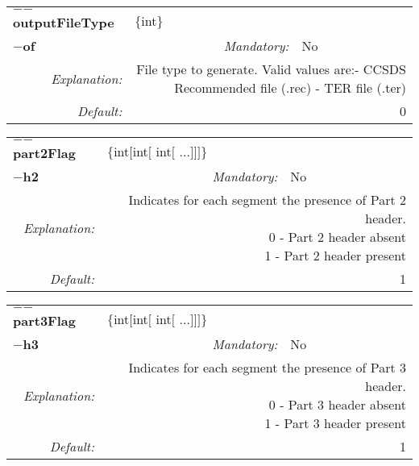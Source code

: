 \begin{center}\begin{tabular}{|rr|rlrl|}
\hline
\multicolumn{2}{|l|}{\textbf{$-$$-$outputFileType}} & \multicolumn{4}{|l|}{$\{$int$\}$} \\
\cline{3-6}
\multicolumn{2}{|l|}{\textbf{$-$of}} & \emph{Mandatory:} & No & &  \\
\hline
\emph{Explanation:} & \multicolumn{5}{|p{12cm}|}{File type to generate. Valid values are:\newline 0- CCSDS Recommended file (.rec) \newline 1- TER file (.ter)} \\
\hline
\emph{Default:} & \multicolumn{5}{|p{12cm}|}{0 } \\
\hline
\end{tabular}\end{center}
\begin{center}\begin{tabular}{|rr|rlrl|}
\hline
\multicolumn{2}{|l|}{\textbf{$-$$-$part2Flag}} & \multicolumn{4}{|l|}{$\{$int$[$int$[$ int$[$ ...$]$$]$$]$$\}$} \\
\cline{3-6}
\multicolumn{2}{|l|}{\textbf{$-$h2}} & \emph{Mandatory:} & No & &  \\
\hline
\emph{Explanation:} & \multicolumn{5}{|p{12cm}|}{Indicates for each segment the presence of Part 2 header.\newline 0 - Part 2 header absent\newline 1 - Part 2 header present} \\
\hline
\emph{Default:} & \multicolumn{5}{|p{12cm}|}{1 } \\
\hline
\end{tabular}\end{center}
\begin{center}\begin{tabular}{|rr|rlrl|}
\hline
\multicolumn{2}{|l|}{\textbf{$-$$-$part3Flag}} & \multicolumn{4}{|l|}{$\{$int$[$int$[$ int$[$ ...$]$$]$$]$$\}$} \\
\cline{3-6}
\multicolumn{2}{|l|}{\textbf{$-$h3}} & \emph{Mandatory:} & No & &  \\
\hline
\emph{Explanation:} & \multicolumn{5}{|p{12cm}|}{Indicates for each segment the presence of Part 3 header.\newline 0 - Part 3 header absent\newline 1 - Part 3 header present} \\
\hline
\emph{Default:} & \multicolumn{5}{|p{12cm}|}{1 } \\
\hline
\end{tabular}\end{center}
